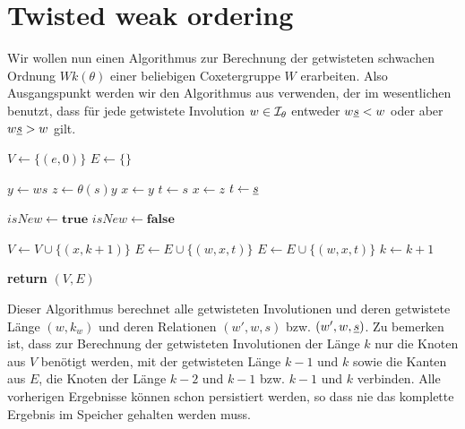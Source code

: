 \section{Twisted weak ordering}

Wir wollen nun einen Algorithmus zur Berechnung der getwisteten schwachen
Ordnung $Wk(\theta)$ einer beliebigen Coxetergruppe $W$ erarbeiten. Also
Ausgangspunkt werden wir den Algorithmus aus \cite[Algorithm 3.1.1]{haas:twoa}
verwenden, der im wesentlichen benutzt, dass für jede getwistete Involution $w
\in \mathcal{I}_{\theta}$ entweder $w \underline{s} < w$ oder aber $w \underline{s} > w$ gilt.

\begin{algo}[Algorithmus 1]
	\hfill
	\label{twoa1}
	\begin{algorithmic}[1]
	 
	\State $V \gets \{(e,0)\}$
	\State $E \gets \{\}$

			  \State $y \gets ws$
				\State $z \gets \theta(s)y$
					\State $x \gets y$ 
					\State $t \gets s$
				\Else
					\State $x \gets z$ 
					\State $t \gets \underline{s}$
				\EndIf
				
				\State $isNew \gets \textbf{true}$
				 
						\State $isNew \gets \textbf{false}$
					\EndIf
				\EndFor
				
					\State $V \gets V \cup \{ (x,k+1) \}$
					\State $E \gets E \cup \{ (w,x,t) \}$
				\Else
					\State $E \gets E \cup \{ (w,x,t) \}$
				\EndIf
			\EndFor
		\EndFor
		\State $k \gets k + 1$
	\EndFor

	\State \textbf{return} $(V,E)$
	\EndProcedure
	\end{algorithmic}
\end{algo}

Dieser Algorithmus berechnet alle getwisteten Involutionen und deren
getwistete Länge $(w,k_w)$ und deren Relationen $(w',w,s)$ bzw. $(w',w,\underline{s})$. Zu bemerken ist, dass zur Berechnung der ge\-twis\-te\-ten Involutionen der
Länge $k$ nur die Knoten aus $V$ benötigt werden, mit der getwisteten Länge $k-1$ und $k$ sowie
die Kanten aus $E$, die Knoten der Länge $k-2$ und $k-1$ bzw. $k-1$ und $k$
verbinden. Alle vorherigen Ergebnisse können schon persistiert werden, so dass
nie das komplette Ergebnis im Speicher gehalten werden muss.

